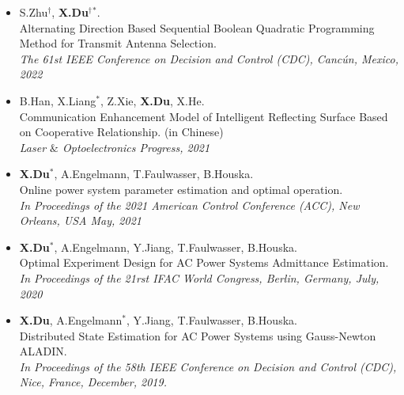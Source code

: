 \documentclass[paper=a4,fontsize=11pt]{scrartcl} %
\begin{document}
\begin{itemize}
	
	\item  { S.Zhu$^{\dag}$, \textbf{X.Du}$^{\dag}$$^*$. \\
		{Alternating Direction Based Sequential Boolean Quadratic Programming Method for Transmit Antenna Selection.}\\
		\emph{ The 61st IEEE Conference on Decision and Control (CDC), Canc\'un, Mexico, 2022
	} }
	
		\item  { B.Han, X.Liang$^*$, Z.Xie, \textbf{X.Du}, X.He. \\
		{Communication Enhancement Model of Intelligent Reflecting Surface Based on Cooperative Relationship. (in Chinese)}\\
		\emph{Laser $\&$ Optoelectronics Progress, 2021
	} }
	
	\item  { \textbf{X.Du}$^*$, A.Engelmann, T.Faulwasser, B.Houska. \\
		{Online power system parameter estimation and optimal operation.}\\
		\emph{In Proceedings of the 2021 American Control Conference (ACC), New Orleans, USA May, 2021
	} }
	
		\item  {\textbf{X.Du}$^*$, A.Engelmann, Y.Jiang, T.Faulwasser, B.Houska. \\
		Optimal Experiment Design for AC Power Systems Admittance Estimation.\\
		\emph{In Proceedings of the 21rst IFAC World Congress, Berlin, Germany, July, 2020
		} }
	
	\item  {\textbf{X.Du}, A.Engelmann$^*$, Y.Jiang, T.Faulwasser, B.Houska. \\
		Distributed State Estimation for AC Power Systems using Gauss-Newton ALADIN. \\
		 \emph{In Proceedings of the 58th IEEE Conference on Decision and Control (CDC),
		Nice, France, December, 2019.} }
\end{itemize}
\end{document}
